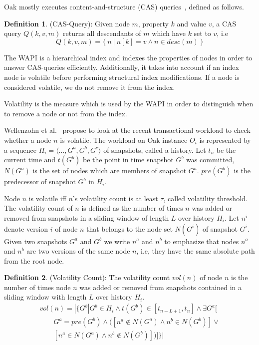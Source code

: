 \documentclass[abstracton,12pt]{scrartcl}
\theoremstyle{definition}
\newtheorem{definition}{Definition}
\begin{document}
Oak mostly executes content-and-structure (CAS) queries~\cite{CM15}, defined as follows.

\begin{definition}
    (CAS-Query): Given node $m$, property $k$ and value $v$, a CAS query $Q(k,v,m)$ returns all descendants of $m$ which have $k$ set to $v$, i.e 
    $$ Q(k,v,m) = \{~n~|~n[k] = v \land n \in desc(m)~\}$$
\end{definition}

The WAPI is a hierarchical index and indexes the properties of nodes in order to answer CAS-queries efficiently.
Additionally, it takes into account if an index node is volatile before performing structural index modifications.
If a node is considered volatile, we do not remove it from the index.

Volatility is the measure which is used by the WAPI in order to distinguish when to remove a node or not from the index.

Wellenzohn et al.~\cite{KW17} propose to look at the recent transactional
workload to check whether a node $n$ is volatile. The workload on Oak instance
$O_i$ is represented by a sequence $H_i = \langle \ldots, G^a, G^b, G^c
\rangle$ of snapshots, called a history. Let $t_n$ be the current time and $t(G^b)$
be the point in time snapshot $G^b$ was committed, $N(G^a)$ is the set of
nodes which are members of snapshot $G^a$.  $pre(G^b)$ is the predecessor of
snapshot $G^b$ in $H_i$.

Node $n$ is volatile iff $n$'s volatility count is at least $\tau$, called volatility threshold.
The volatility count of $n$ is defined as the number of times $n$ was added or removed from snapshots in a sliding window of length $L$ over history $H_i$.
Let $n^i$ denote version $i$ of node $n$ that belongs to the node set $N(G^i)$ of snapshot $G^i$.
Given two snapshots $G^a$ and $G^b$ we write $n^a$ and $n^b$ to emphasize that nodes $n^a$ and $n^b$ are two versions of the same node $n$, i.e, they have the same absolute path from the root node.

\begin{definition}
    (Volatility Count): The volatility count $vol(n)$ of node $n$ is the number of times node $n$ was added or removed from snapshots contained in a sliding window with length $L$ over history $H_i$.
    \begin{equation}
        \begin{split}
            vol(n) = | \{ G^b | G^b \in H_i \land t(G^b) \in [t_{n-L+1}, t_n] \land \exists G^a[ \\
            \qquad G^a = pre(G^b) \land ([n^a \notin N(G^a) \land n^b \in N(G^b)]\lor \\
            \qquad [n^a \in N(G^a) \land n^b \notin N(G^b)] )]\} |
        \end{split}
    \end{equation}
    \label{def:vol_count}
\end{definition}
\end{document}
